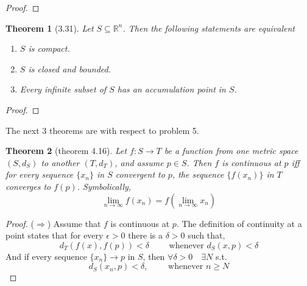 \documentclass[aps,pra,notitlepage,amsmath,amssymb,letterpaper,12pt]{revtex4-1}
\newtheorem{theorem}{Theorem}
\begin{document}
\begin{proof}
\end{proof}


\begin{theorem}[3.31]
Let $S \subseteq \mathbb{R}^n$. Then the following statements are equivalent
\begin{enumerate}[\upshape a)]
  \item $S$ is compact. %
  \item $S$ is closed and bounded.
  \item Every infinite subset of $S$ has an accumulation point in $S$.
\end{enumerate}
\end{theorem}

\begin{proof}
\end{proof}


The next 3 theorems are with respect to problem 5.
\begin{theorem}[theorem 4.16]
Let $f:S \to T$  be a function from one metric space $(S,d_{S})$ to another $(T,d_{T})$, and assume $p \in S$. Then $f$ is continuous at $p$ iff for every sequence $\{x_{n}\}$ in $S$ convergent to $p$, the sequence $\{f(x_{n})\}$ in $T$ converges to $f(p)$. Symbolically,
\[\lim_{n \to \infty} f(x_{n}) = f(\lim_{n \to \infty} x_{n})\]
\end{theorem}
\begin{proof}
($\Longrightarrow$) Assume that $f$ is continuous at $p$. The definition of continuity at a point states that for every $\epsilon > 0$ there is a $\delta >0$ such that,
\[d_{T}(f(x),f(p)) < \delta \qquad \textrm{  whenever  } d_{S}(x,p) < \delta\]
And if every sequence $\{x_{n}\} \rightarrow p$ in $S$, then  $\forall \delta > 0 \quad \exists N$ s.t. $$d_{S}(x_{n},p) < \delta, \qquad \textrm{ whenever } n \geq N$$
\end{proof}
\end{document}

